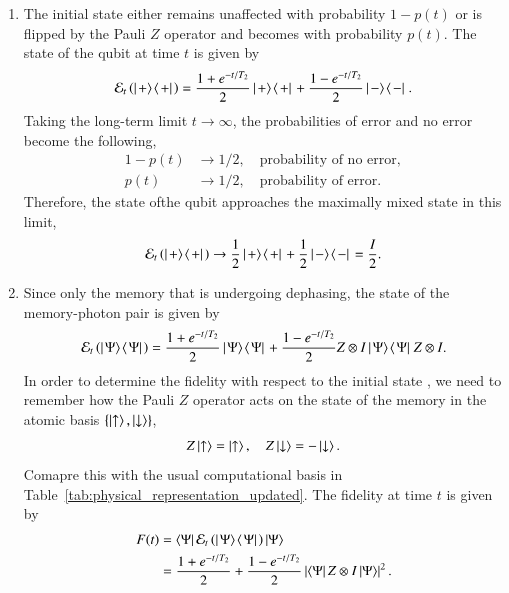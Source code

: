 \begin{solution}
\begin{enumerate}[label=(\alph*)]
    \item The initial state \ket{+} either remains unaffected with probability $1-p(t)$ or is flipped by the Pauli $Z$ operator and becomes \ket{-} with probability $p(t)$. The state of the qubit at time $t$ is given by
    \begin{equation*}
        \mathcal{E}_t\left( \left|\left. + \rangle\right.\!\langle\left. + \right|\right.  \right) = \frac{1+e^{-t/T_2}}{2}\left|\left. + \rangle\right.\!\langle\left. + \right|\right.  + \frac{1-e^{-t/T_2}}{2}\left|\left. - \rangle\right.\!\langle\left. - \right|\right. .
    \end{equation*}
    Taking the long-term limit $t\rightarrow\infty$, the probabilities of error and no error become the following,
    \begin{align*}
        1-p(t) & \rightarrow 1/2, \quad \text{probability of no error}, \\
        p(t) & \rightarrow 1/2, \quad \text{probability of error}.
    \end{align*}
    Therefore, the state ofthe qubit approaches the maximally mixed state in this limit,
    \begin{equation*}
        \mathcal{E}_t\left( \left|\left. + \rangle\right.\!\langle\left. + \right|\right.  \right) \rightarrow \frac{1}{2}\left|\left. + \rangle\right.\!\langle\left. + \right|\right.  + \frac{1}{2}\left|\left. - \rangle\right.\!\langle\left. - \right|\right.  = \frac{I}{2}.
    \end{equation*}
    \item Since only the memory that is undergoing dephasing, the state of the memory-photon pair is given by
    \begin{equation*}
        \mathcal{E}_t \left( \left|\left. \Psi \rangle\right.\!\langle\left. \Psi \right|\right.  \right) = \frac{1+e^{-t/T_2}}{2} \left|\left. \Psi \rangle\right.\!\langle\left. \Psi \right|\right.  + \frac{1-e^{-t/T_2}}{2} Z \otimes I \left|\left. \Psi \rangle\right.\!\langle\left. \Psi \right|\right.  Z \otimes I.
    \end{equation*}
    In order to determine the fidelity with respect to the initial state \ket{\Psi}, we need to remember how the Pauli $Z$ operator acts on the state of the memory in the atomic basis $\{\left| \uparrow \right\rangle,\left| \downarrow \right\rangle\}$,
    \begin{equation*}
        Z\ket{\uparrow} = \ket{\uparrow}, \quad Z\ket{\downarrow} = - \ket{\downarrow}.
    \end{equation*}
    Comapre this with the usual computational basis in Table~\ref{tab:physical_representation_updated}.
    The fidelity at time $t$ is given by
    \begin{align*}
        F(t) & = \bra{\Psi} \mathcal{E}_t\left( \outp{\Psi}{\Psi} \right) \ket{\Psi} \\
        & = \frac{1+e^{-t/T_2}}{2} + \frac{1-e^{-t/T_2}}{2} \left| \bra{\Psi} Z \otimes I \ket{\Psi} \right|^2.

\end{align*}
\end{enumerate}
\end{solution}
